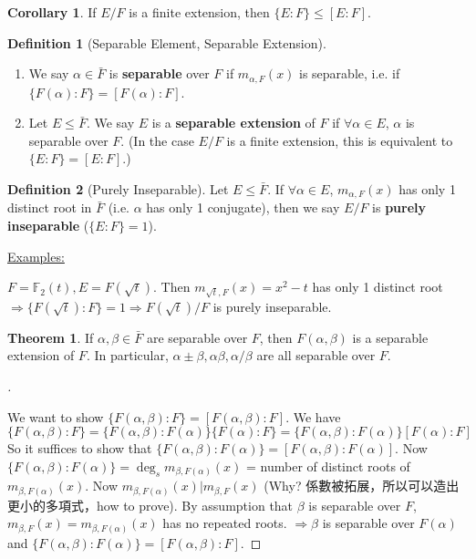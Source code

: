 \documentclass[12pt]{article}
\theoremstyle{definition}
\newtheorem{thm}{Theorem}
\newcommand{\ex}{\noindent\underline{Examples:}}
\newtheorem{dfn}{Definition}
\newtheorem{cor}{Corollary}
\newenvironment{proofs}[1][\proofname]{%
  \begin{proof}[#1]$ $\par\nobreak\ignorespaces
}{%
  \end{proof}
}
\begin{document}
\begin{cor}
	If $E/F$ is a finite extension, then $\{E:F\} \leq [E:F]$.
\end{cor}

\begin{dfn}[Separable Element, Separable Extension]
	\
	\begin{enumerate}
		\item[(1)] We say $\alpha \in \bar{F}$ is \textbf{separable} over $F$ if $m_{\alpha, F}(x)$ is separable, i.e. if $\{F(\alpha):F\} = [F(\alpha):F]$.

		\item[(2)] Let $E \leq \bar{F}$.
			We say $E$ is a \textbf{separable extension} of $F$ if $\forall \alpha \in E$, $\alpha$ is separable over $F$.
			(In the case $E/F$ is a finite extension, this is equivalent to $\{E:F\} = [E:F]$.)
	\end{enumerate}

\end{dfn}
\begin{dfn}[Purely Inseparable]
	Let $E \leq \bar{F}$.
	If $\forall \alpha \in E$, $m_{\alpha, F}(x)$ has only 1 distinct root in $\bar{F}$ (i.e. $\alpha$ has only 1 conjugate), then we say $E/F$ is \textbf{purely inseparable} ($\{E:F\}=1$).
\end{dfn}

\ex

$F = \mathbb{F}_2(t), E = F(\sqrt{t})$.
Then $m_{\sqrt{t}, F}(x) = x^2 - t$ has only 1 distinct root $\Rightarrow \{F(\sqrt{t}):F\} = 1 \Rightarrow F(\sqrt{t})/F$ is purely inseparable.

\begin{thm}
	If $\alpha, \beta \in \bar{F}$ are separable over $F$, then $F(\alpha, \beta)$ is a separable extension of $F$.
	In particular, $\alpha \pm \beta, \alpha \beta, \alpha/\beta$ are all separable over $F$.
\end{thm}

\begin{proofs}
	We want to show $\{F(\alpha, \beta) :F\} = [F(\alpha, \beta):F]$.
	We have
	\[
		\{F(\alpha, \beta):F\} = \{ F(\alpha, \beta):F(\alpha)\}\{F(\alpha):F\} = \{ F(\alpha, \beta):F(\alpha)\}[F(\alpha):F]
	\]
	So it suffices to show that $\{F(\alpha, \beta):F(\alpha)\} = [F(\alpha, \beta):F(\alpha)]$.
	Now $\{F(\alpha, \beta) :F(\alpha)\} = \deg_s m_{\beta, F(\alpha)}(x)$ = number of distinct roots of $m_{\beta, F(\alpha)}(x)$.
	Now $m_{\beta, F(\alpha)}(x) | m_{\beta, F}(x)$ (Why? 係數被拓展，所以可以造出更小的多項式，how to prove).
	By assumption that $\beta$ is separable over $F$, $m_{\beta, F}(x) = m_{\beta, F(\alpha)}(x)$ has no repeated roots.
	$\Rightarrow \beta$ is separable over $F(\alpha)$ and $\{F(\alpha, \beta):F(\alpha)\} = [F(\alpha, \beta):F]$.
\end{proofs}
\end{document}
